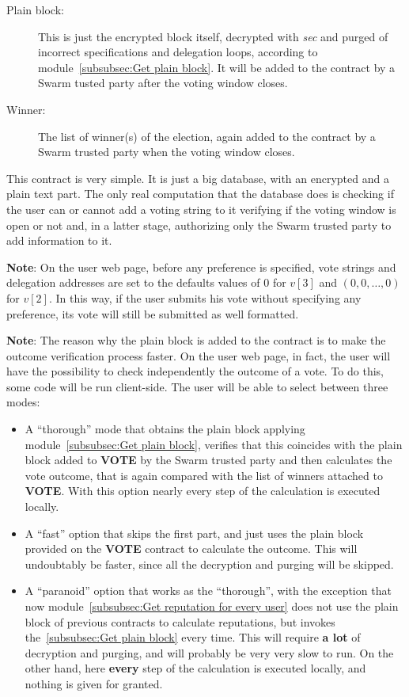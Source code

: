 \documentclass[submission, copyright,creativecommons,sharealike,noncommercial]{eptcs}
\newcommand{\Vote}{\textbf{VOTE}\xspace}
\begin{document}
\begin{description}
		\item[Plain block:] This is just the encrypted block itself, decrypted with \emph{sec} and purged of incorrect specifications and delegation loops, according to module~\ref{subsubsec:Get plain block}. It will be added to the contract by a Swarm tusted party after the voting window closes.
			
		\item[Winner:] The list of winner(s) of the election, again added to the contract by a Swarm trusted party when the voting window closes. 
	\end{description}
	This contract is very simple. It is just a big database, with an encrypted and a plain text part. The only real computation that the database does is checking if the user can or cannot add a voting string to it verifying if the voting window is open or not and, in a latter stage, authorizing only the Swarm trusted party to add information to it.

	\textbf{Note}: On the user web page, before any preference is specified, vote strings and delegation addresses are set to the defaults values of $0$ for $v[3]$ and $(0,0, \dots, 0)$ for $v[2]$. In this way, if the user submits his vote without specifying any preference, its vote will still be submitted as well formatted.
		
	\textbf{Note}: The reason why the plain block is added to the contract is to make the outcome verification process faster. On the user web page, in fact, the user will have the possibility to check independently the outcome of a vote. To do this, some code will be run client-side. The user will be able to select between three modes:
	\begin{itemize}
		\item A ``thorough'' mode that obtains the plain block applying module~\ref{subsubsec:Get plain block}, verifies that this coincides with the plain block added to \Vote by the Swarm trusted party and then calculates the vote outcome, that is again compared with the list of winners attached to \Vote. With this option nearly every step of the calculation is executed locally.
		
		\item A ``fast'' option that skips the first part, and just uses the plain block provided on the \Vote contract to calculate the outcome. This will undoubtably be faster, since all the decryption and purging will be skipped.
		
		\item A ``paranoid'' option that works as the ``thorough'', with the exception that now module~\ref{subsubsec:Get reputation for every user} does not use the plain block of previous contracts to calculate reputations, but invokes the~\ref{subsubsec:Get plain block} every time. This will require \textbf{a lot} of decryption and purging, and will probably be very very slow to run. On the other hand, here \textbf{every} step of the calculation is executed locally, and nothing is given for granted.
	\end{itemize} 
%
%
\end{document}

